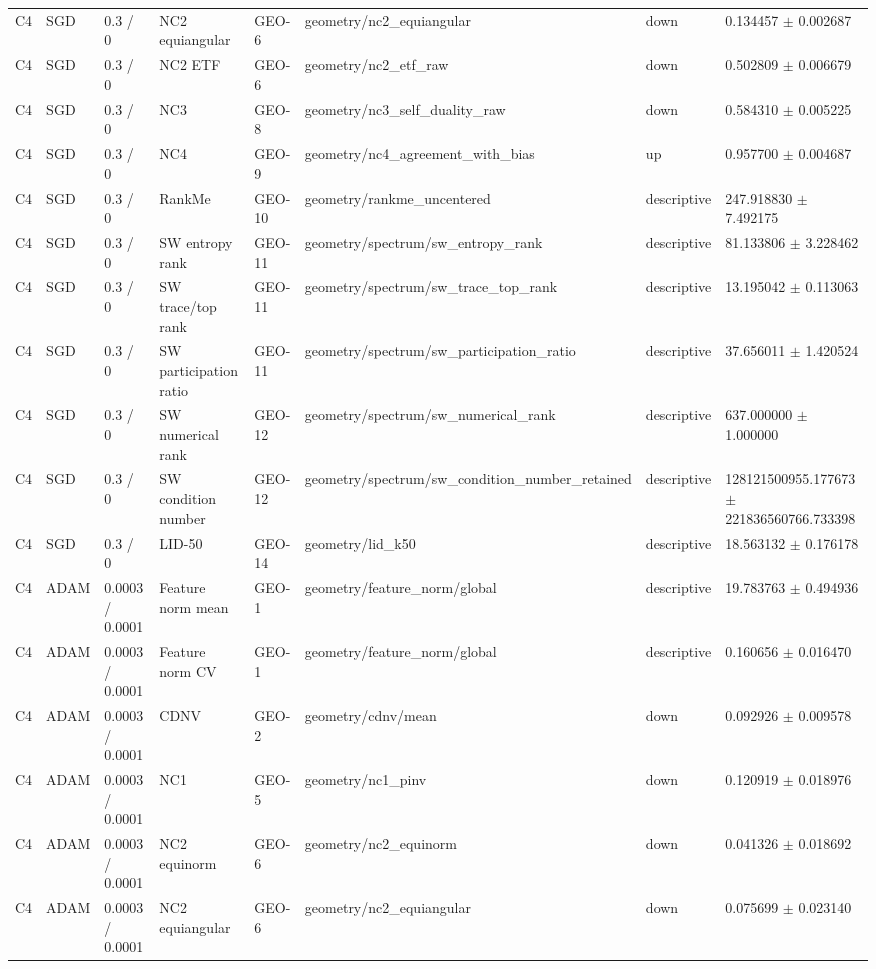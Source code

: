 \begin{longtable}{llllllll}
C4 & SGD & 0.3 / 0 & NC2 equiangular & GEO-6 & geometry/nc2\_equiangular & down & 0.134457 $\pm$ 0.002687 \\
C4 & SGD & 0.3 / 0 & NC2 ETF & GEO-6 & geometry/nc2\_etf\_raw & down & 0.502809 $\pm$ 0.006679 \\
C4 & SGD & 0.3 / 0 & NC3 & GEO-8 & geometry/nc3\_self\_duality\_raw & down & 0.584310 $\pm$ 0.005225 \\
C4 & SGD & 0.3 / 0 & NC4 & GEO-9 & geometry/nc4\_agreement\_with\_bias & up & 0.957700 $\pm$ 0.004687 \\
C4 & SGD & 0.3 / 0 & RankMe & GEO-10 & geometry/rankme\_uncentered & descriptive & 247.918830 $\pm$ 7.492175 \\
C4 & SGD & 0.3 / 0 & SW entropy rank & GEO-11 & geometry/spectrum/sw\_entropy\_rank & descriptive & 81.133806 $\pm$ 3.228462 \\
C4 & SGD & 0.3 / 0 & SW trace/top rank & GEO-11 & geometry/spectrum/sw\_trace\_top\_rank & descriptive & 13.195042 $\pm$ 0.113063 \\
C4 & SGD & 0.3 / 0 & SW participation ratio & GEO-11 & geometry/spectrum/sw\_participation\_ratio & descriptive & 37.656011 $\pm$ 1.420524 \\
C4 & SGD & 0.3 / 0 & SW numerical rank & GEO-12 & geometry/spectrum/sw\_numerical\_rank & descriptive & 637.000000 $\pm$ 1.000000 \\
C4 & SGD & 0.3 / 0 & SW condition number & GEO-12 & geometry/spectrum/sw\_condition\_number\_retained & descriptive & 128121500955.177673 $\pm$ 221836560766.733398 \\
C4 & SGD & 0.3 / 0 & LID-50 & GEO-14 & geometry/lid\_k50 & descriptive & 18.563132 $\pm$ 0.176178 \\
C4 & ADAM & 0.0003 / 0.0001 & Feature norm mean & GEO-1 & geometry/feature\_norm/global & descriptive & 19.783763 $\pm$ 0.494936 \\
C4 & ADAM & 0.0003 / 0.0001 & Feature norm CV & GEO-1 & geometry/feature\_norm/global & descriptive & 0.160656 $\pm$ 0.016470 \\
C4 & ADAM & 0.0003 / 0.0001 & CDNV & GEO-2 & geometry/cdnv/mean & down & 0.092926 $\pm$ 0.009578 \\
C4 & ADAM & 0.0003 / 0.0001 & NC1 & GEO-5 & geometry/nc1\_pinv & down & 0.120919 $\pm$ 0.018976 \\
C4 & ADAM & 0.0003 / 0.0001 & NC2 equinorm & GEO-6 & geometry/nc2\_equinorm & down & 0.041326 $\pm$ 0.018692 \\
C4 & ADAM & 0.0003 / 0.0001 & NC2 equiangular & GEO-6 & geometry/nc2\_equiangular & down & 0.075699 $\pm$ 0.023140 \\

\end{longtable}
